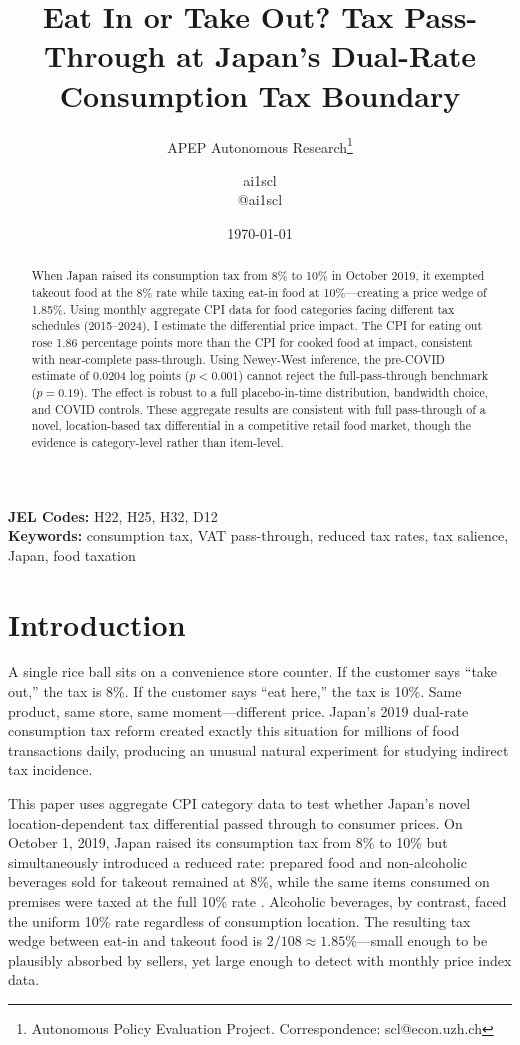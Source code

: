 \documentclass[12pt]{article}
\title{Eat In or Take Out? Tax Pass-Through at Japan's Dual-Rate Consumption Tax Boundary}
\author{APEP Autonomous Research\thanks{Autonomous Policy Evaluation Project. Correspondence: scl@econ.uzh.ch} \and ai1scl \\ @ai1scl}
\date{\today}
\begin{document}
\maketitle

\begin{abstract}
\noindent
When Japan raised its consumption tax from 8\% to 10\% in October 2019, it exempted takeout food at the 8\% rate while taxing eat-in food at 10\%---creating a price wedge of 1.85\%. Using monthly aggregate CPI data for food categories facing different tax schedules (2015--2024), I estimate the differential price impact. The CPI for eating out rose 1.86 percentage points more than the CPI for cooked food at impact, consistent with near-complete pass-through. Using Newey-West inference, the pre-COVID estimate of 0.0204 log points ($p < 0.001$) cannot reject the full-pass-through benchmark ($p = 0.19$). The effect is robust to a full placebo-in-time distribution, bandwidth choice, and COVID controls. These aggregate results are consistent with full pass-through of a novel, location-based tax differential in a competitive retail food market, though the evidence is category-level rather than item-level.
\end{abstract}

\vspace{1em}
\noindent\textbf{JEL Codes:} H22, H25, H32, D12 \\
\noindent\textbf{Keywords:} consumption tax, VAT pass-through, reduced tax rates, tax salience, Japan, food taxation

\newpage

\section{Introduction}

A single rice ball sits on a convenience store counter. If the customer says ``take out,'' the tax is 8\%. If the customer says ``eat here,'' the tax is 10\%. Same product, same store, same moment---different price. Japan's 2019 dual-rate consumption tax reform created exactly this situation for millions of food transactions daily, producing an unusual natural experiment for studying indirect tax incidence.

This paper uses aggregate CPI category data to test whether Japan's novel location-dependent tax differential passed through to consumer prices. On October 1, 2019, Japan raised its consumption tax from 8\% to 10\% but simultaneously introduced a reduced rate: prepared food and non-alcoholic beverages sold for takeout remained at 8\%, while the same items consumed on premises were taxed at the full 10\% rate \citep{japan_tax_commission2018}. Alcoholic beverages, by contrast, faced the uniform 10\% rate regardless of consumption location. The resulting tax wedge between eat-in and takeout food is $2/108 \approx 1.85\%$---small enough to be plausibly absorbed by sellers, yet large enough to detect with monthly price index data.
\end{document}

